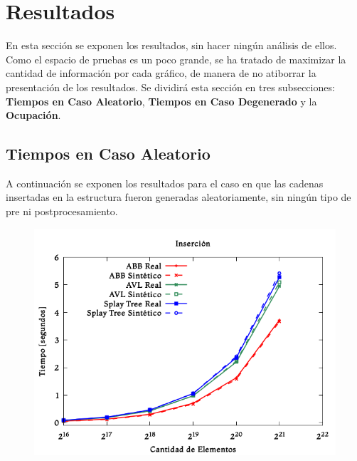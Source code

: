 \documentclass[12pt,letterpaper]{report}
\begin{document}
\newpage
\section{Resultados}

En esta sección se exponen los resultados, sin hacer ningún análisis de ellos. Como el espacio de pruebas es un poco grande, se ha tratado de maximizar la cantidad de información por cada gráfico, de manera de no atiborrar la presentación de los resultados. Se dividirá esta sección en tres subsecciones: \textbf{Tiempos en Caso Aleatorio}, \textbf{Tiempos en Caso Degenerado} y la \textbf{Ocupación}.

\subsection{Tiempos en Caso Aleatorio}
\label{subsec:res_aleatorio}

A continuación se exponen los resultados para el caso en que las cadenas insertadas en la estructura fueron generadas aleatoriamente, sin ningún tipo de pre ni postprocesamiento.\\

\begin{figure}[H]
\begin{center}
\includegraphics[scale=0.65]{random_insercion.png}
\end{center}
\end{figure}
\end{document}
